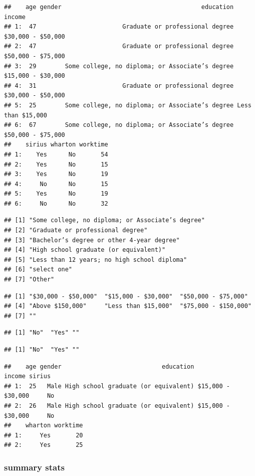 \documentclass[
  12pt,
]{article}
\begin{document}
\begin{verbatim}
##    age gender                                       education            income
## 1:  47                        Graduate or professional degree $30,000 - $50,000
## 2:  47                        Graduate or professional degree $50,000 - $75,000
## 3:  29        Some college, no diploma; or Associate’s degree $15,000 - $30,000
## 4:  31                        Graduate or professional degree $30,000 - $50,000
## 5:  25        Some college, no diploma; or Associate’s degree Less than $15,000
## 6:  67        Some college, no diploma; or Associate’s degree $50,000 - $75,000
##    sirius wharton worktime
## 1:    Yes      No       54
## 2:    Yes      No       15
## 3:    Yes      No       19
## 4:     No      No       15
## 5:    Yes      No       19
## 6:     No      No       32
\end{verbatim}

\begin{verbatim}
## [1] "Some college, no diploma; or Associate’s degree"
## [2] "Graduate or professional degree"                
## [3] "Bachelor’s degree or other 4-year degree"       
## [4] "High school graduate (or equivalent)"           
## [5] "Less than 12 years; no high school diploma"     
## [6] "select one"                                     
## [7] "Other"
\end{verbatim}

\begin{verbatim}
## [1] "$30,000 - $50,000"  "$15,000 - $30,000"  "$50,000 - $75,000" 
## [4] "Above $150,000"     "Less than $15,000"  "$75,000 - $150,000"
## [7] ""
\end{verbatim}

\begin{verbatim}
## [1] "No"  "Yes" ""
\end{verbatim}

\begin{verbatim}
## [1] "No"  "Yes" ""
\end{verbatim}

\begin{verbatim}
##    age gender                            education            income sirius
## 1:  25   Male High school graduate (or equivalent) $15,000 - $30,000     No
## 2:  26   Male High school graduate (or equivalent) $15,000 - $30,000     No
##    wharton worktime
## 1:     Yes       20
## 2:     Yes       25
\end{verbatim}

\hypertarget{summary-stats}{%
\subsubsection{summary stats}\label{summary-stats}}
\end{document}
